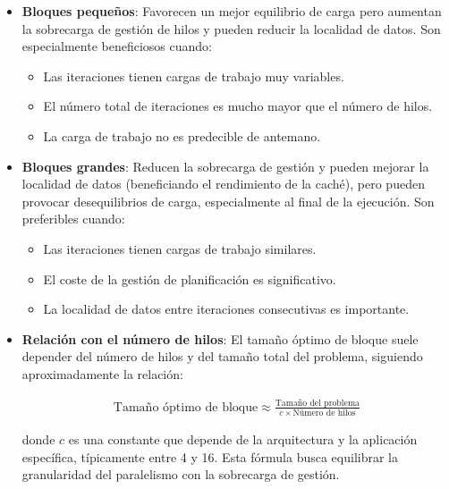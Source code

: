                 \begin{itemize}
                
                    \item \textbf{Bloques pequeños}: Favorecen un mejor equilibrio de carga pero aumentan la sobrecarga de gestión de hilos y pueden reducir la localidad de datos. Son especialmente beneficiosos cuando:
                
                        \begin{itemize}
                            \item Las iteraciones tienen cargas de trabajo muy variables.
                            \item El número total de iteraciones es mucho mayor que el número de hilos.
                            \item La carga de trabajo no es predecible de antemano.
                        \end{itemize}
                    
                \item \textbf{Bloques grandes}: Reducen la sobrecarga de gestión y pueden mejorar la localidad de datos (beneficiando el rendimiento de la caché), pero pueden provocar desequilibrios de carga, especialmente al final de la ejecución. Son preferibles cuando:
                
                    \begin{itemize}
                        \item Las iteraciones tienen cargas de trabajo similares.
                        \item El coste de la gestión de planificación es significativo.
                        \item La localidad de datos entre iteraciones consecutivas es importante.
                    \end{itemize}
    
                \item \textbf{Relación con el número de hilos}: El tamaño óptimo de bloque suele depender del número de hilos y del tamaño total del problema, siguiendo aproximadamente la relación:
                
                    \begin{align}
                        \text{Tamaño óptimo de bloque} \approx \frac{\text{Tamaño del problema}}{c \times \text{Número de hilos}}
                    \end{align}
                        
                    donde $c$ es una constante que depende de la arquitectura y la aplicación específica, típicamente entre 4 y 16. Esta fórmula busca equilibrar la granularidad del paralelismo con la sobrecarga de gestión.
    
            \end{itemize}
        
